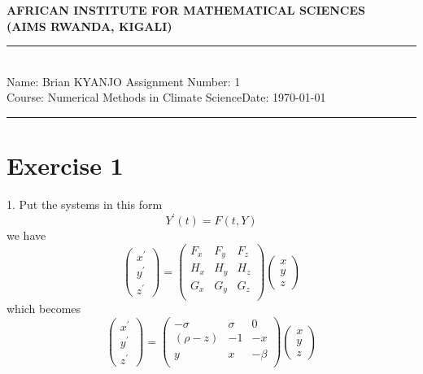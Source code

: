 \documentclass[12pt,a4paper]{article}
\newcommand{\student}{Brian KYANJO }
\newcommand{\course}{Numerical Methods in Climate Science}
\newcommand{\assignment}{1}
\begin{document}
\thispagestyle{empty}
\begin{center}
\textbf{AFRICAN INSTITUTE FOR MATHEMATICAL SCIENCES \\[0.5cm]
(AIMS RWANDA, KIGALI)}
\vspace{1.0cm}
\end{center}

\noindent
\rule{17cm}{0.2cm}\\[0.3cm]
Name: \student \hfill Assignment Number: \assignment\\[0.1cm]
Course: \course \hfill Date: \today\\
\rule{17cm}{0.05cm}
\vspace{1.0cm}

\section*{Exercise 1} 
1. Put the systems in this form
$$ Y^{\prime}(t)=F(t,Y)$$
we have $$\begin{pmatrix}
	x^{\prime} \\ 
	y^{\prime} \\ 
	z^{\prime}
\end{pmatrix} =\begin{pmatrix}
F_{x} & F_{y} & F_{z} \\ 
H_{x} & H_{y} & H_{z} \\ 
G_{x} & G_{y} & G_{z} \\ 
\end{pmatrix} \begin{pmatrix}
x \\ 
y \\ 
z
\end{pmatrix}$$
which becomes 
\begin{equation}
\begin{pmatrix}
x^{\prime} \\ 
y^{\prime} \\ 
z^{\prime}
\end{pmatrix} =\begin{pmatrix}
-\sigma & \sigma & 0 \\ 
(\rho - z) & -1 & -x \\ 
y & x & -\beta \\ 
\end{pmatrix} \begin{pmatrix}
x \\ 
y \\ 
z
\end{pmatrix}
\label{0}
\end{equation}
\end{document}
